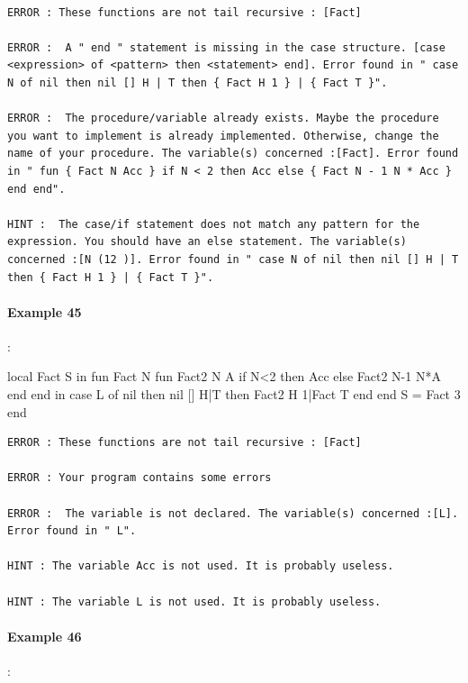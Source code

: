 \documentclass[11pt,a4paper,twoside,openright]{report}
\begin{document}
\begin{lstlisting}

ERROR : These functions are not tail recursive : [Fact]

ERROR :  A " end " statement is missing in the case structure. [case <expression> of <pattern> then <statement> end]. Error found in " case N of nil then nil [] H | T then { Fact H 1 } | { Fact T }".

ERROR :  The procedure/variable already exists. Maybe the procedure you want to implement is already implemented. Otherwise, change the name of your procedure. The variable(s) concerned :[Fact]. Error found in " fun { Fact N Acc } if N < 2 then Acc else { Fact N - 1 N * Acc } end end".

HINT :  The case/if statement does not match any pattern for the expression. You should have an else statement. The variable(s) concerned :[N (12 )]. Error found in " case N of nil then nil [] H | T then { Fact H 1 } | { Fact T }".

\end{lstlisting}


\paragraph{Example 45}:

\begin{OZ}

local Fact S in 
	fun {Fact N}
		fun {Fact2 N A}
			if N<2 then Acc
		    else {Fact2 N-1 N*A} end
		end
		in
		   case L of nil then nil
					   [] H|T then {Fact2 H 1}|{Fact T}
		   end
	end
	S = {Fact 3}
end

\end{OZ}

\begin{lstlisting}
ERROR : These functions are not tail recursive : [Fact]

ERROR : Your program contains some errors

ERROR :  The variable is not declared. The variable(s) concerned :[L]. Error found in " L".

HINT : The variable Acc is not used. It is probably useless.

HINT : The variable L is not used. It is probably useless.

\end{lstlisting}

\paragraph{Example 46}:
\end{document}
